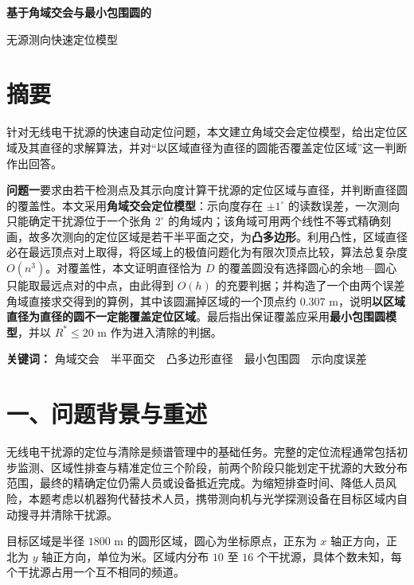 \documentclass[UTF8,a4paper,zihao=-4,fontset=fandol]{ctexart}
\begin{document}
\thispagestyle{plain}
\begin{center}{\LARGE\bfseries 基于角域交会与最小包围圆的\par\vspace{0.25em}无源测向快速定位模型\par}\end{center}
\vspace{0.4em}

\section*{\centering 摘要}

针对无线电干扰源的快速自动定位问题，本文建立角域交会定位模型，给出定位区域及其直径的求解算法，并对“以区域直径为直径的圆能否覆盖定位区域”这一判断作出回答。

\textbf{问题一}要求由若干检测点及其示向度计算干扰源的定位区域与直径，并判断直径圆的覆盖性。本文采用\textbf{角域交会定位模型}：示向度存在 $\pm1^\circ$ 的读数误差，一次测向只能确定干扰源位于一个张角 $2^\circ$ 的角域内；该角域可用两个线性不等式精确刻画，故多次测向的定位区域是若干半平面之交，为\textbf{凸多边形}。利用凸性，区域直径必在最远顶点对上取得，将区域上的极值问题化为有限次顶点比较，算法总复杂度 $O(n^3)$。对覆盖性，本文证明直径恰为 $D$ 的覆盖圆没有选择圆心的余地---圆心只能取最远点对的中点，由此得到 $O(h)$ 的充要判据；并构造了一个由两个误差角域直接求交得到的算例，其中该圆漏掉区域的一个顶点约 $0.307$ m，说明\textbf{以区域直径为直径的圆不一定能覆盖定位区域}。最后指出保证覆盖应采用\textbf{最小包围圆模型}，并以 $R^*\le20$ m 作为进入清除的判据。

\textbf{关键词：} 角域交会　半平面交　凸多边形直径　最小包围圆　示向度误差

\clearpage
\section*{一、问题背景与重述}

无线电干扰源的定位与清除是频谱管理中的基础任务。完整的定位流程通常包括初步监测、区域性排查与精准定位三个阶段，前两个阶段只能划定干扰源的大致分布范围，最终的精确定位仍需人员或设备抵近完成。为缩短排查时间、降低人员风险，本题考虑以机器狗代替技术人员，携带测向机与光学探测设备在目标区域内自动搜寻并清除干扰源。

目标区域是半径 $1800$ m 的圆形区域，圆心为坐标原点，正东为 $x$ 轴正方向，正北为 $y$ 轴正方向，单位为米。区域内分布 $10$ 至 $16$ 个干扰源，具体个数未知，每个干扰源占用一个互不相同的频道。
\end{document}
